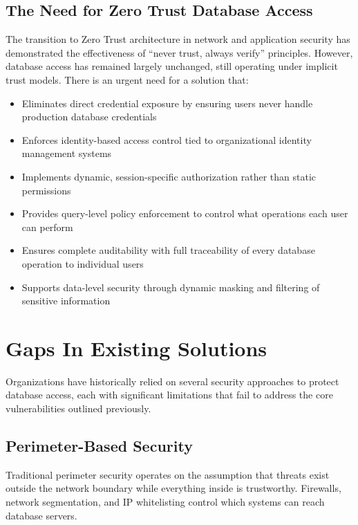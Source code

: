 \subsection{The Need for Zero Trust Database Access}
The transition to Zero Trust architecture in network and application security has demonstrated the effectiveness of ``never trust, always verify'' principles. However, database access has remained largely unchanged, still operating under implicit trust models. There is an urgent need for a solution that:
\begin{itemize}
    \item Eliminates direct credential exposure by ensuring users never handle production database credentials
    \item Enforces identity-based access control tied to organizational identity management systems
    \item Implements dynamic, session-specific authorization rather than static permissions
    \item Provides query-level policy enforcement to control what operations each user can perform
    \item Ensures complete auditability with full traceability of every database operation to individual users
    \item Supports data-level security through dynamic masking and filtering of sensitive information
\end{itemize}

\section{Gaps In Existing Solutions}
Organizations have historically relied on several security approaches to protect database access, each with significant limitations that fail to address the core vulnerabilities outlined previously.

\subsection{Perimeter-Based Security}
Traditional perimeter security operates on the assumption that threats exist outside the network boundary while everything inside is trustworthy. Firewalls, network segmentation, and IP whitelisting control which systems can reach database servers.

